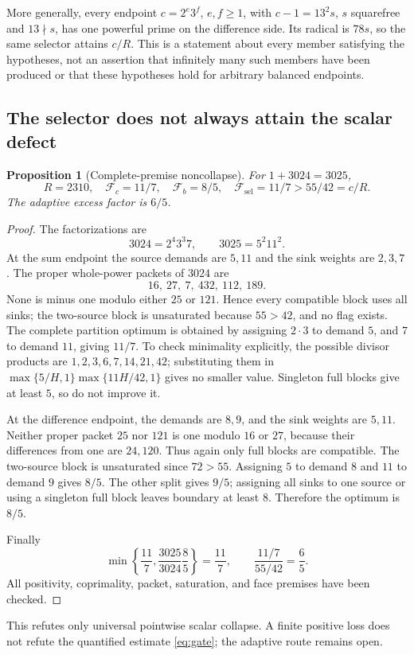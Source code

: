 \documentclass[11pt]{article}
\newtheorem{proposition}[theorem]{Proposition}
\theoremstyle{definition}\newtheorem{definition}[theorem]{Definition}
\theoremstyle{remark}\newtheorem{remark}[theorem]{Remark}
\newcommand{\F}{\mathcal F}
\begin{document}
More generally, every endpoint \(c=2^e3^f\), \(e,f\ge1\), with \(c-1=13^2s\), \(s\) squarefree and \(13\nmid s\), has one powerful prime on the difference side. Its radical is \(78s\), so the same selector attains \(c/R\). This is a statement about every member satisfying the hypotheses, not an assertion that infinitely many such members have been produced or that these hypotheses hold for arbitrary balanced endpoints.

\subsection{The selector does not always attain the scalar defect}
\begin{proposition}[Complete-premise noncollapse]\label{prop:counter}
For \(1+3024=3025\),
\[
 R=2310,\quad \F_c=11/7,\quad\F_b=8/5,\quad
 \F_{\mathrm{sel}}=11/7>55/42=c/R.
\]
The adaptive excess factor is \(6/5\).
\end{proposition}
\begin{proof}
The factorizations are
\[
 3024=2^4 3^3 7,\qquad3025=5^2 11^2.
\]
At the sum endpoint the source demands are \(5,11\) and the sink weights are \(2,3,7\). The proper whole-power packets of \(3024\) are
\[
 16,\ 27,\ 7,\ 432,\ 112,\ 189.
\]
None is minus one modulo either \(25\) or \(121\). Hence every compatible block uses all sinks; the two-source block is unsaturated because \(55>42\), and no flag exists. The complete partition optimum is obtained by assigning \(2\cdot3\) to demand \(5\), and \(7\) to demand \(11\), giving \(11/7\). To check minimality explicitly, the possible divisor products are \(1,2,3,6,7,14,21,42\); substituting them in \(\max\{5/H,1\}\max\{11H/42,1\}\) gives no smaller value. Singleton full blocks give at least \(5\), so do not improve it.

At the difference endpoint, the demands are \(8,9\), and the sink weights are \(5,11\). Neither proper packet \(25\) nor \(121\) is one modulo \(16\) or \(27\), because their differences from one are \(24,120\). Thus again only full blocks are compatible. The two-source block is unsaturated since \(72>55\). Assigning \(5\) to demand \(8\) and \(11\) to demand \(9\) gives \(8/5\). The other split gives \(9/5\); assigning all sinks to one source or using a singleton full block leaves boundary at least \(8\). Therefore the optimum is \(8/5\).

Finally
\[
 \min\left\{\frac{11}7,\frac{3025}{3024}\frac85\right\}
 =\frac{11}7,
 \qquad\frac{11/7}{55/42}=\frac65.
\]
All positivity, coprimality, packet, saturation, and face premises have been checked.
\end{proof}
This refutes only universal pointwise scalar collapse. A finite positive loss does not refute the quantified estimate \eqref{eq:gate}; the adaptive route remains open.
\end{document}
